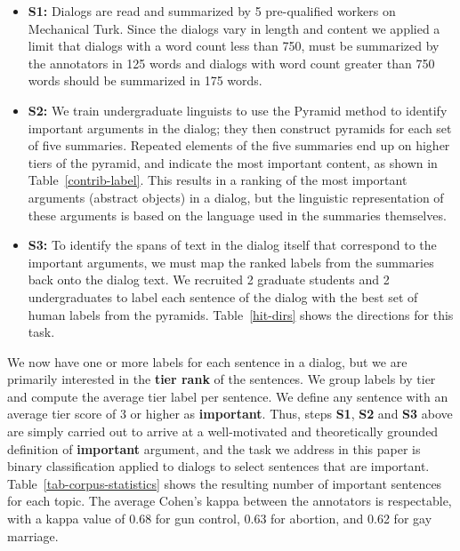 \documentclass[11pt]{article}
\begin{document}
\begin{itemize}
\item {\bf S1:} Dialogs are 
read and summarized by 5 pre-qualified workers on Mechanical
Turk. Since the dialogs vary in length and content we applied a
limit that dialogs with a word count less than 750, must be summarized
by the annotators in 125 words and dialogs with word count greater
than 750 words should be summarized in 175 words. 
\item {\bf S2:} We train undergraduate linguists to use 
the Pyramid method \cite{pyramid04} to identify
important arguments in the dialog; they then construct
pyramids for each set of five summaries. Repeated elements of the five
summaries end up on higher tiers of the pyramid, and indicate the most
important content, as shown in Table~\ref{contrib-label}. This results
in a ranking of the most important arguments (abstract objects)
in a dialog, but the
linguistic representation of these arguments is based on 
the language used in the summaries themselves. 
\item {\bf S3:} To identify the
spans of text in the dialog itself that correspond to the
important arguments, we must map the ranked labels
from the summaries back onto the dialog text.  We recruited
2 graduate students and 2 undergraduates to label each sentence of the
dialog with the best set of human labels from the pyramids.
Table~\ref{hit-dirs} shows the directions for this task.
\end{itemize}


We now have one or more labels for each sentence in a dialog, but we
are primarily interested in the {\bf tier rank} of the sentences.  We
group labels by tier and compute the average tier label per sentence.
We define any sentence with an average tier score of 3 or higher as
\textbf{important}.  Thus, steps {\bf S1}, {\bf S2} and {\bf S3} above
are simply carried out to arrive at a well-motivated and theoretically
grounded definition of \textbf{important} argument, and the task we
address in this paper is binary classification applied to dialogs to
select sentences that are important.
Table~\ref{tab-corpus-statistics} shows the resulting number of
important sentences for each topic. 
The average Cohen's kappa between the annotators
is respectable, with  a kappa value of 0.68
for gun control, 0.63 for abortion, and 0.62 for 
gay marriage.
\end{document}
